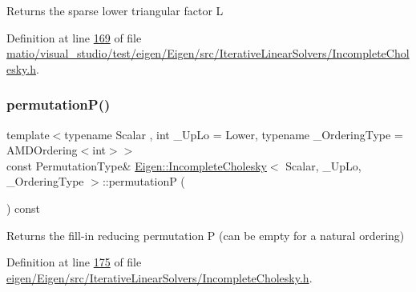 \begin{DoxyReturn}{Returns}
the sparse lower triangular factor L 
\end{DoxyReturn}


Definition at line \hyperlink{matio_2visual__studio_2test_2eigen_2_eigen_2src_2_iterative_linear_solvers_2_incomplete_cholesky_8h_source_l00169}{169} of file \hyperlink{matio_2visual__studio_2test_2eigen_2_eigen_2src_2_iterative_linear_solvers_2_incomplete_cholesky_8h_source}{matio/visual\+\_\+studio/test/eigen/\+Eigen/src/\+Iterative\+Linear\+Solvers/\+Incomplete\+Cholesky.\+h}.

\mbox{\label{class_eigen_1_1_incomplete_cholesky_a0d52cec5e17f485a362766363ba90b02}} 
\subsubsection{\texorpdfstring{permutation\+P()}{permutationP()}\hspace{0.1cm}{\footnotesize\ttfamily [1/2]}}
{\footnotesize\ttfamily template$<$typename Scalar , int \+\_\+\+Up\+Lo = Lower, typename \+\_\+\+Ordering\+Type  = A\+M\+D\+Ordering$<$int$>$$>$ \\
const Permutation\+Type\& \hyperlink{class_eigen_1_1_incomplete_cholesky}{Eigen\+::\+Incomplete\+Cholesky}$<$ Scalar, \+\_\+\+Up\+Lo, \+\_\+\+Ordering\+Type $>$\+::permutationP (\begin{DoxyParamCaption}{ }\end{DoxyParamCaption}) const\hspace{0.3cm}{\ttfamily [inline]}}

\begin{DoxyReturn}{Returns}
the fill-\/in reducing permutation P (can be empty for a natural ordering) 
\end{DoxyReturn}


Definition at line \hyperlink{eigen_2_eigen_2src_2_iterative_linear_solvers_2_incomplete_cholesky_8h_source_l00175}{175} of file \hyperlink{eigen_2_eigen_2src_2_iterative_linear_solvers_2_incomplete_cholesky_8h_source}{eigen/\+Eigen/src/\+Iterative\+Linear\+Solvers/\+Incomplete\+Cholesky.\+h}.

\mbox{\label{class_eigen_1_1_incomplete_cholesky_a0d52cec5e17f485a362766363ba90b02}} 
